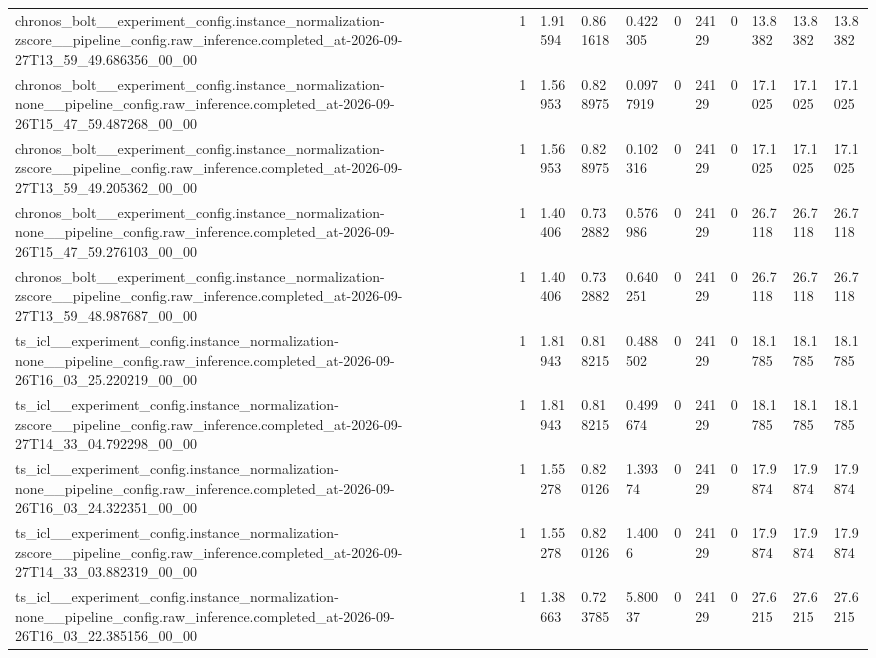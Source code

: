 \begin{tabular}{lllllllllll}
chronos\_bolt\_\_experiment\_config.instance\_normalization-zscore\_\_pipeline\_config.raw\_inference.completed\_at-2026-09-27T13\_59\_49.686356\_00\_00 & 1 & 1.91594 & 0.861618 & 0.422305 & 0 & 24129 & 0 & 13.8382 & 13.8382 & 13.8382 \\
chronos\_bolt\_\_experiment\_config.instance\_normalization-none\_\_pipeline\_config.raw\_inference.completed\_at-2026-09-26T15\_47\_59.487268\_00\_00 & 1 & 1.56953 & 0.828975 & 0.0977919 & 0 & 24129 & 0 & 17.1025 & 17.1025 & 17.1025 \\
chronos\_bolt\_\_experiment\_config.instance\_normalization-zscore\_\_pipeline\_config.raw\_inference.completed\_at-2026-09-27T13\_59\_49.205362\_00\_00 & 1 & 1.56953 & 0.828975 & 0.102316 & 0 & 24129 & 0 & 17.1025 & 17.1025 & 17.1025 \\
chronos\_bolt\_\_experiment\_config.instance\_normalization-none\_\_pipeline\_config.raw\_inference.completed\_at-2026-09-26T15\_47\_59.276103\_00\_00 & 1 & 1.40406 & 0.732882 & 0.576986 & 0 & 24129 & 0 & 26.7118 & 26.7118 & 26.7118 \\
chronos\_bolt\_\_experiment\_config.instance\_normalization-zscore\_\_pipeline\_config.raw\_inference.completed\_at-2026-09-27T13\_59\_48.987687\_00\_00 & 1 & 1.40406 & 0.732882 & 0.640251 & 0 & 24129 & 0 & 26.7118 & 26.7118 & 26.7118 \\
ts\_icl\_\_experiment\_config.instance\_normalization-none\_\_pipeline\_config.raw\_inference.completed\_at-2026-09-26T16\_03\_25.220219\_00\_00 & 1 & 1.81943 & 0.818215 & 0.488502 & 0 & 24129 & 0 & 18.1785 & 18.1785 & 18.1785 \\
ts\_icl\_\_experiment\_config.instance\_normalization-zscore\_\_pipeline\_config.raw\_inference.completed\_at-2026-09-27T14\_33\_04.792298\_00\_00 & 1 & 1.81943 & 0.818215 & 0.499674 & 0 & 24129 & 0 & 18.1785 & 18.1785 & 18.1785 \\
ts\_icl\_\_experiment\_config.instance\_normalization-none\_\_pipeline\_config.raw\_inference.completed\_at-2026-09-26T16\_03\_24.322351\_00\_00 & 1 & 1.55278 & 0.820126 & 1.39374 & 0 & 24129 & 0 & 17.9874 & 17.9874 & 17.9874 \\
ts\_icl\_\_experiment\_config.instance\_normalization-zscore\_\_pipeline\_config.raw\_inference.completed\_at-2026-09-27T14\_33\_03.882319\_00\_00 & 1 & 1.55278 & 0.820126 & 1.4006 & 0 & 24129 & 0 & 17.9874 & 17.9874 & 17.9874 \\
ts\_icl\_\_experiment\_config.instance\_normalization-none\_\_pipeline\_config.raw\_inference.completed\_at-2026-09-26T16\_03\_22.385156\_00\_00 & 1 & 1.38663 & 0.723785 & 5.80037 & 0 & 24129 & 0 & 27.6215 & 27.6215 & 27.6215 \\

\end{tabular}

